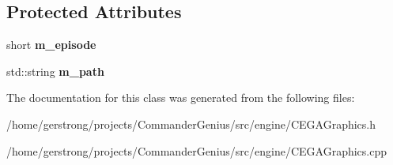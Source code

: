 \subsection*{Protected Attributes}
\begin{DoxyCompactItemize}
\item 
\hypertarget{class_c_e_g_a_graphics_acea64dfb256584e7d0f4dee286e16139}{
short {\bfseries m\_\-episode}}
\label{class_c_e_g_a_graphics_acea64dfb256584e7d0f4dee286e16139}

\item 
\hypertarget{class_c_e_g_a_graphics_a0741671502e6d526922b9257cc25584b}{
std::string {\bfseries m\_\-path}}
\label{class_c_e_g_a_graphics_a0741671502e6d526922b9257cc25584b}

\end{DoxyCompactItemize}


The documentation for this class was generated from the following files:\begin{DoxyCompactItemize}
\item 
/home/gerstrong/projects/CommanderGenius/src/engine/CEGAGraphics.h\item 
/home/gerstrong/projects/CommanderGenius/src/engine/CEGAGraphics.cpp\end{DoxyCompactItemize}
